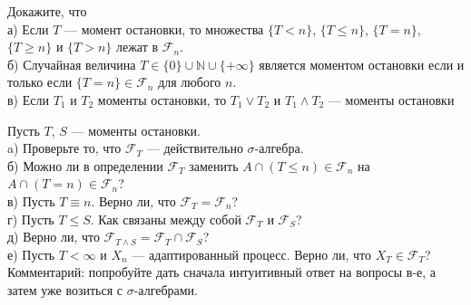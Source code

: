 \begin{problem}
 Докажите, что \\
а) Если $T$ --- момент остановки, то множества $\{T<n\}$, $\{T\le
n\}$, $\{T=n\}$, $\{T\ge n\}$ и $\{T>n\}$ лежат в
$\mathcal{F}_{n}$. \\
б) Случайная величина $T\in \{0\}\cup \mathbb{N}\cup \{+\infty\}$
является моментом остановки если и только если $\{T=n\}\in
\mathcal{F}_{n}$ для любого $n$. \\
в) Если $T_{1}$ и $T_{2}$ моменты остановки, то $T_{1}\vee T_{2}$
и $T_{1}\wedge T_{2}$ --- моменты остановки 
\end{problem} 
\begin{solution} 

\end{solution}

\begin{problem}
 Пусть $T$, $S$ --- моменты остановки. \\
a) Проверьте то, что $\mathcal{F}_{T}$ --- действительно
$\sigma$-алгебра. \\
б) Можно ли в определении $\mathcal{F}_{T}$ заменить $A\cap (T\le
n)\in \mathcal{F}_{n}$ на $A\cap (T=n)\in
\mathcal{F}_{n}$? \\
в) Пусть $T\equiv n$. Верно ли, что
$\mathcal{F}_{T}=\mathcal{F}_{n}$? \\
г) Пусть $T\le S$. Как связаны между собой $\mathcal{F}_{T}$ и
$\mathcal{F}_{S}$? \\
д) Верно ли, что $\mathcal{F}_{T\wedge S}=\mathcal{F}_{T}\cap
\mathcal{F}_{S}$? \\
е) Пусть $T<\infty$ и $X_{n}$ --- адаптированный процесс. Верно
ли, что $X_{T}\in \mathcal{F}_{T}$? \\
Комментарий: попробуйте дать сначала интуитивный ответ на вопросы
в-е, а затем уже возиться с $\sigma$-алгебрами. 
\end{problem} 
\begin{solution} 

\end{solution}

